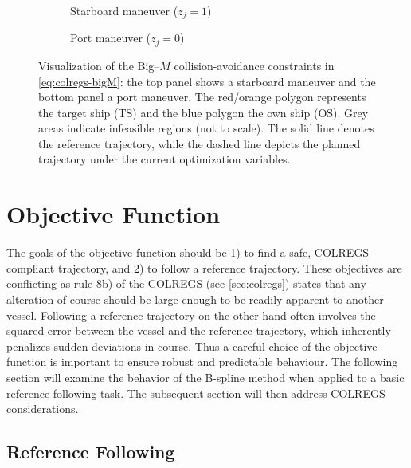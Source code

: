 \begin{figure}
    \centering
    \begin{subfigure}[t]{\textwidth}
        \centering
        
        \caption{Starboard maneuver ($z_j=1$)}
        \label{fig:non-convex-obstacle-mi-sb}
    \end{subfigure}
    \begin{subfigure}[t]{\textwidth}
        \centering
        
        \caption{Port maneuver ($z_j=0$)}
        \label{fig:non-convex-obstacle-mi-port}
    \end{subfigure}
    \caption{Visualization of the Big–$M$ collision-avoidance constraints in \cref{eq:colregs-bigM}: the top panel shows a starboard maneuver and the bottom panel a port maneuver. The red/orange polygon represents the target ship (TS) and the blue polygon the own ship (OS). Grey areas indicate infeasible regions (not to scale). The solid line denotes the reference trajectory, while the dashed line depicts the planned trajectory under the current optimization variables.}
    \label{fig:non-convex-obstacle-mi}
\end{figure}



\section{Objective Function}
The goals of the objective function should be 1) to find a safe, COLREGS-compliant trajectory, and 2) to follow a reference trajectory. These objectives are conflicting as rule 8b) of the COLREGS (see \cref{sec:colregs}) states that any alteration of course should be large enough to be readily apparent to another vessel. Following a reference trajectory on the other hand often involves the squared error between the vessel and the reference trajectory, which inherently penalizes sudden deviations in course. 
Thus a careful choice of the objective function is important to ensure robust and predictable behaviour. 
The following section will examine the behavior of the B-spline method when applied to a basic reference-following task. The subsequent section will then address COLREGS considerations.


\subsection{Reference Following}
\label{sec:oscillations}


